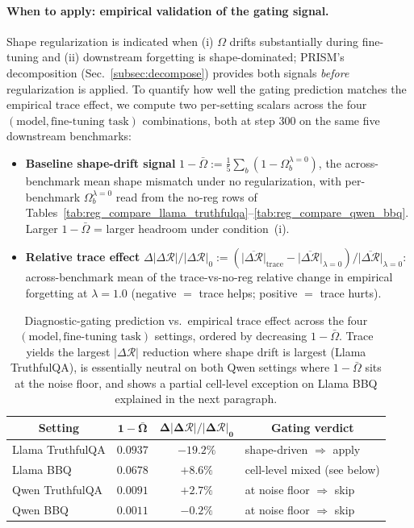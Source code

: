 \paragraph{When to apply: empirical validation of the gating signal.}
Shape regularization is indicated when (i) $\Omega$ drifts substantially during fine-tuning and (ii) downstream forgetting is shape-dominated; PRISM's decomposition (Sec.~\ref{subsec:decompose}) provides both signals \emph{before} regularization is applied. To quantify how well the gating prediction matches the empirical trace effect, we compute two per-setting scalars across the four $(\text{model}, \text{fine-tuning task})$ combinations, both at step $300$ on the same five downstream benchmarks:
\begin{itemize}[leftmargin=*,nosep,topsep=2pt]
    \item \textbf{Baseline shape-drift signal} $1{-}\bar{\Omega} := \tfrac{1}{5}\sum_b (1-\Omega_b^{\lambda=0})$, the across-benchmark mean shape mismatch under no regularization, with per-benchmark $\Omega_b^{\lambda=0}$ read from the no-reg rows of Tables~\ref{tab:reg_compare_llama_truthfulqa}--\ref{tab:reg_compare_qwen_bbq}. Larger $1{-}\bar{\Omega}$ = larger headroom under condition~(i).
    \item \textbf{Relative trace effect} $\Delta|\Delta\mathcal{R}|/|\Delta\mathcal{R}|_0 := (\overline{|\Delta\mathcal{R}|}_{\mathrm{trace}} - \overline{|\Delta\mathcal{R}|}_{\lambda=0})/\overline{|\Delta\mathcal{R}|}_{\lambda=0}$: across-benchmark mean of the trace-vs-no-reg relative change in empirical forgetting at $\lambda{=}1.0$ (negative $=$ trace helps; positive $=$ trace hurts).
\end{itemize}

\begin{table}[h]
\centering
\small
\setlength{\tabcolsep}{8pt}
\caption{Diagnostic-gating prediction vs.\ empirical trace effect across the four $(\text{model}, \text{fine-tuning task})$ settings, ordered by decreasing $1{-}\bar{\Omega}$. Trace yields the largest $|\Delta\mathcal{R}|$ reduction where shape drift is largest (Llama TruthfulQA), is essentially neutral on both Qwen settings where $1{-}\bar{\Omega}$ sits at the noise floor, and shows a partial cell-level exception on Llama BBQ explained in the next paragraph.}
\label{tab:reg_gating}
\begin{tabular}{l c c l}
\toprule
\multicolumn{1}{c}{\textbf{Setting}} & $\boldsymbol{1{-}\bar{\Omega}}$ & $\boldsymbol{\Delta|\Delta\mathcal{R}|/|\Delta\mathcal{R}|_0}$ & \multicolumn{1}{c}{\textbf{Gating verdict}} \\
\midrule
Llama TruthfulQA & $0.0937$ & $-19.2\%$ & shape-driven $\Rightarrow$ apply \\
Llama BBQ        & $0.0678$ & $+8.6\%$  & cell-level mixed (see below) \\
Qwen TruthfulQA  & $0.0091$ & $+2.7\%$  & at noise floor $\Rightarrow$ skip \\
Qwen BBQ         & $0.0011$ & $-0.2\%$  & at noise floor $\Rightarrow$ skip \\
\bottomrule
\end{tabular}
\end{table}

